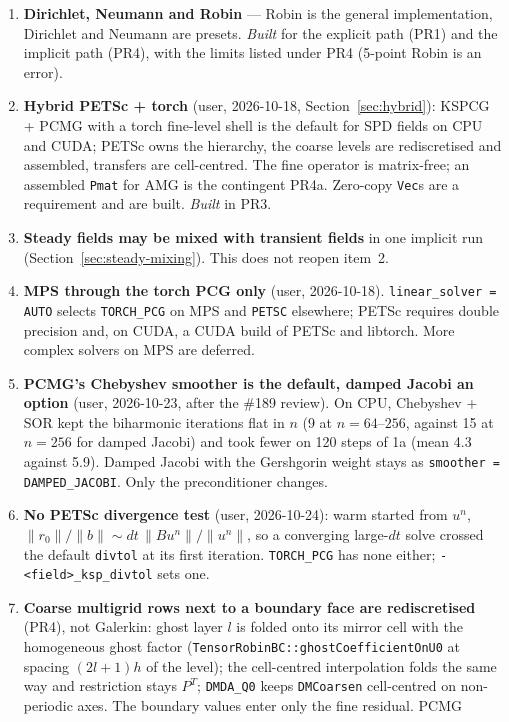 \documentclass[11pt]{article}
\begin{document}
\begin{enumerate}[leftmargin=*]
\item \textbf{Dirichlet, Neumann and Robin} --- Robin is the general
implementation, Dirichlet and Neumann are presets. \emph{Built} for the
explicit path (PR1) and the implicit path (PR4), with the limits listed
under PR4 (5-point Robin is an error).
\item \textbf{Hybrid PETSc + torch} (user, 2026-10-18,
Section~\ref{sec:hybrid}): KSPCG + PCMG with a torch fine-level shell is the
default for SPD fields on CPU and CUDA; PETSc owns the hierarchy, the coarse
levels are rediscretised and assembled, transfers are cell-centred. The
fine operator is matrix-free; an assembled \texttt{Pmat} for AMG is the
contingent PR4a. Zero-copy \texttt{Vec}s are a requirement and are built.
\emph{Built} in PR3.
\item \textbf{Steady fields may be mixed with transient fields} in one
implicit run (Section~\ref{sec:steady-mixing}). This does not reopen item~2.
\item \textbf{MPS through the torch PCG only} (user, 2026-10-18).
\texttt{linear\_solver = AUTO} selects \texttt{TORCH\_PCG} on MPS and
\texttt{PETSC} elsewhere; PETSc requires double precision and, on CUDA, a
CUDA build of PETSc and libtorch. More complex solvers on MPS are deferred.
\item \textbf{PCMG's Chebyshev smoother is the default, damped Jacobi an
option} (user, 2026-10-23, after the \#189 review). On CPU, Chebyshev + SOR kept
the biharmonic iterations flat in $n$ (9 at $n = 64$--$256$, against 15 at
$n = 256$ for damped Jacobi) and took fewer on 120 steps of 1a (mean 4.3 against
5.9). Damped Jacobi with the Gershgorin weight stays as
\texttt{smoother = DAMPED\_JACOBI}. Only the preconditioner changes.
\item \textbf{No PETSc divergence test} (user, 2026-10-24): warm started from
$u^n$, $\|r_0\|/\|b\| \sim dt\,\|Bu^n\|/\|u^n\|$, so a converging large-$dt$ solve
crossed the default \texttt{divtol} at its first iteration. \texttt{TORCH\_PCG}
has none either; \texttt{-<field>\_ksp\_divtol} sets one.
\item \textbf{Coarse multigrid rows next to a boundary face are
rediscretised} (PR4), not Galerkin: ghost layer $l$ is folded onto its
mirror cell with the homogeneous ghost factor
(\texttt{TensorRobinBC::ghostCoefficientOnU0} at spacing $(2l+1)h$ of the
level); the cell-centred interpolation folds the same way and restriction
stays $P^T$; \texttt{DMDA\_Q0} keeps \texttt{DMCoarsen} cell-centred on
non-periodic axes. The boundary values enter only the fine residual. PCMG

\end{enumerate}
\end{document}
